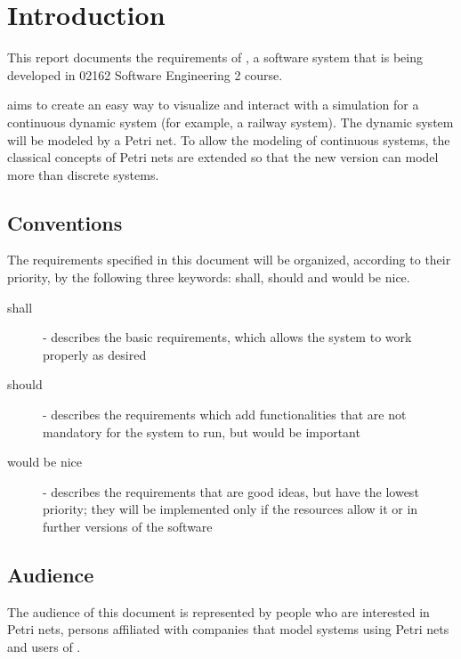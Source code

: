 \section{Introduction}

This report documents the requirements of \epns, a software system that is being developed in 02162 Software Engineering 2 course.

\epns aims to create an easy way to visualize and interact with a simulation for a continuous dynamic system
(for example, a railway system).
The dynamic system will be modeled by a Petri net. To allow the modeling of continuous systems,
the classical concepts of Petri nets are extended so that the new version can model more than discrete systems.


\subsection{Conventions}

The requirements specified in this document will be organized, according to their priority,
by the following three keywords: shall, should and would be nice.
\begin{description}
  \item[shall] - describes the basic requirements, which allows the system to
  work properly as desired
  \item[should]  - describes the requirements which add functionalities that are
  not mandatory for the system to run, but would be important
  \item[would be nice] - describes the requirements that are good ideas, but
  have the lowest priority; they will be implemented only if the resources allow it or in further versions of the software
\end{description}

\subsection{Audience}
 
The audience of this document is represented by people who are interested in Petri nets, persons affiliated with companies that model systems using Petri nets and users of \epns.

